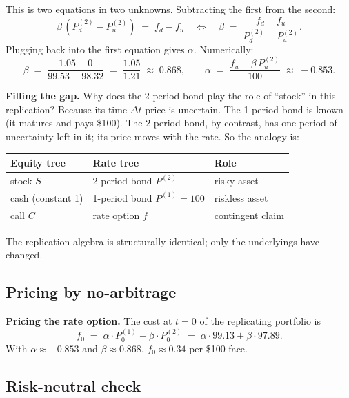 This is two equations in two unknowns. Subtracting the first from
the second:
\[
  \beta\,(P^{(2)}_d - P^{(2)}_u) \;=\; f_d - f_u
  \quad\Longleftrightarrow\quad
  \beta \;=\; \frac{f_d - f_u}{P^{(2)}_d - P^{(2)}_u}.
\]
Plugging back into the first equation gives $\alpha$. Numerically:
\[
  \beta \;=\; \frac{1.05 - 0}{99.53 - 98.32} \;=\; \frac{1.05}{1.21}
       \;\approx\; 0.868,
  \qquad
  \alpha \;=\; \frac{f_u - \beta\,P^{(2)}_u}{100} \;\approx\; -0.853.
\]

\begin{tipblock}
\textbf{Filling the gap.} Why does the 2-period bond play the role
of ``stock'' in this replication? Because its time-$\Delta t$ price
is uncertain. The 1-period bond is known (it matures and pays \$100).
The 2-period bond, by contrast, has one period of uncertainty left
in it; its price moves with the rate. So the analogy is:

\begin{center}
\begin{tabular}{l|l|l}
\textbf{Equity tree} & \textbf{Rate tree} & \textbf{Role} \\
\hline
stock $S$              & 2-period bond $P^{(2)}$ & risky asset \\
cash (constant 1)      & 1-period bond $P^{(1)} = 100$ & riskless asset \\
call $C$               & rate option $f$         & contingent claim
\end{tabular}
\end{center}

The replication algebra is structurally identical; only the
underlyings have changed.
\end{tipblock}

\subsection{Pricing by no-arbitrage}\label{L8-sec:rateprice}

\begin{keyblock}
\textbf{Pricing the rate option.}
The cost at $t = 0$ of the replicating portfolio is
\[
  f_0 \;=\; \alpha \cdot P^{(1)}_0 + \beta \cdot P^{(2)}_0
       \;=\; \alpha \cdot 99.13 + \beta \cdot 97.89.
\]
With $\alpha \approx -0.853$ and $\beta \approx 0.868$,
$f_0 \approx 0.34$ per \$100 face.
\end{keyblock}

\subsection{Risk-neutral check}\label{L8-sec:rncheck}

